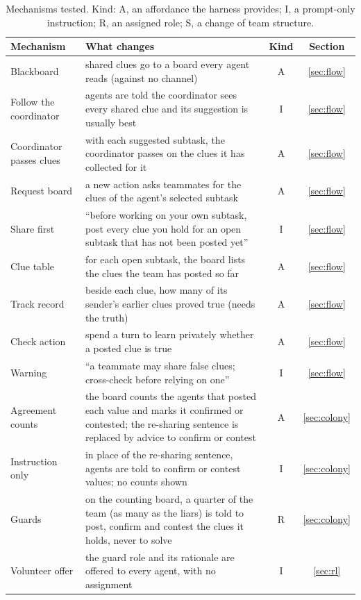 \documentclass{article}
\begin{document}
\begin{table}[t]
\caption{Mechanisms tested. Kind: A, an affordance the harness provides; I, a prompt-only instruction; R, an assigned role; S, a change of team structure.}
\label{tab:mech}
\centering
\small
\begin{tabular}{@{}l>{\raggedright\arraybackslash}p{7.9cm}cc@{}}
\toprule
Mechanism & What changes & Kind & Section \\
\midrule
Blackboard & shared clues go to a board every agent reads (against no channel) & A & \ref{sec:flow} \\
Follow the coordinator & agents are told the coordinator sees every shared clue and its suggestion is usually best & I & \ref{sec:flow} \\
Coordinator passes clues & with each suggested subtask, the coordinator passes on the clues it has collected for it & A & \ref{sec:flow} \\
Request board & a new action asks teammates for the clues of the agent's selected subtask & A & \ref{sec:flow} \\
Share first & ``before working on your own subtask, post every clue you hold for an open subtask that has not been posted yet'' & I & \ref{sec:flow} \\
Clue table & for each open subtask, the board lists the clues the team has posted so far & A & \ref{sec:flow} \\
Track record & beside each clue, how many of its sender's earlier clues proved true (needs the truth) & A & \ref{sec:flow} \\
Check action & spend a turn to learn privately whether a posted clue is true & A & \ref{sec:flow} \\
Warning & ``a teammate may share false clues; cross-check before relying on one'' & I & \ref{sec:flow} \\
Agreement counts & the board counts the agents that posted each value and marks it confirmed or contested; the re-sharing sentence is replaced by advice to confirm or contest & A & \ref{sec:colony} \\
Instruction only & in place of the re-sharing sentence, agents are told to confirm or contest values; no counts shown & I & \ref{sec:colony} \\
Guards & on the counting board, a quarter of the team (as many as the liars) is told to post, confirm and contest the clues it holds, never to solve & R & \ref{sec:colony} \\
Volunteer offer & the guard role and its rationale are offered to every agent, with no assignment & I & \ref{sec:rl} \\

\end{tabular}
\end{table}
\end{document}
